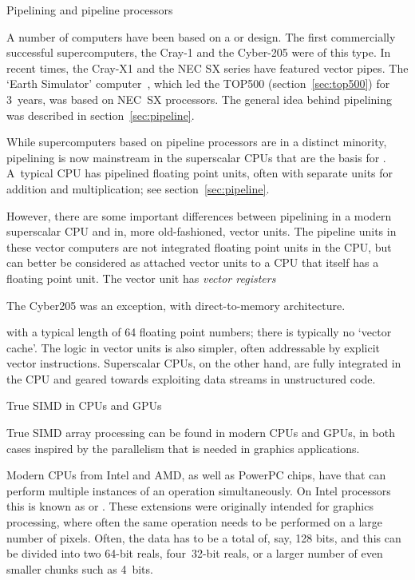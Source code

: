  {Pipelining and pipeline processors}
\label{sec:vector}

A number of computers have been based on a  or  design. The first
commercially successful supercomputers, the Cray-1 and the Cyber-205
were of this type. In recent times, the Cray-X1 and the NEC SX series
have featured vector pipes. The `Earth Simulator'
computer~\cite{Sato2004}, which led the TOP500
(section~\ref{sec:top500}) for 3~years, was based on NEC~SX
processors.  The general idea behind pipelining was described in
section~\ref{sec:pipeline}.

While supercomputers based on pipeline processors are in a distinct
minority, pipelining is now mainstream in the superscalar CPUs that
are the basis for . A~typical CPU has pipelined floating point
units, often with separate units for addition and multiplication; see
section~\ref{sec:pipeline}.

However, there are some important differences between pipelining in a
modern superscalar CPU and in, more old-fashioned, vector units.  The
pipeline units in these vector computers are not integrated floating
point units in the CPU, but can better be considered as attached
vector units to a CPU that itself has a floating point unit. The
vector unit has \emph{vector registers}
\begin{footnoteenv}
  {The Cyber205 was an exception, with direct-to-memory architecture.}
\end{footnoteenv}
with a typical
length of 64 floating point numbers; there is typically no `vector
cache'. The logic in vector units is also simpler, often addressable
by explicit vector instructions. Superscalar CPUs, on the other hand,
are fully integrated in the CPU and geared towards exploiting data
streams in unstructured code.

 {True SIMD in CPUs and GPUs}
\label{sec:sse-avx}

True SIMD array processing can be found in modern CPUs and GPUs, in
both cases inspired by the parallelism that is needed in graphics
applications.

Modern CPUs from Intel and AMD, as well as
PowerPC chips, have  that can perform
multiple instances of an operation simultaneously. On Intel processors
this is known as  or . These extensions were
originally intended for graphics processing, where often the same
operation needs to be performed on a large number of pixels. Often,
the data has to be a total of, say, 128 bits, and this can be divided
into two 64-bit reals, four~32-bit reals, or a larger number of even
smaller chunks such as 4~bits. 

